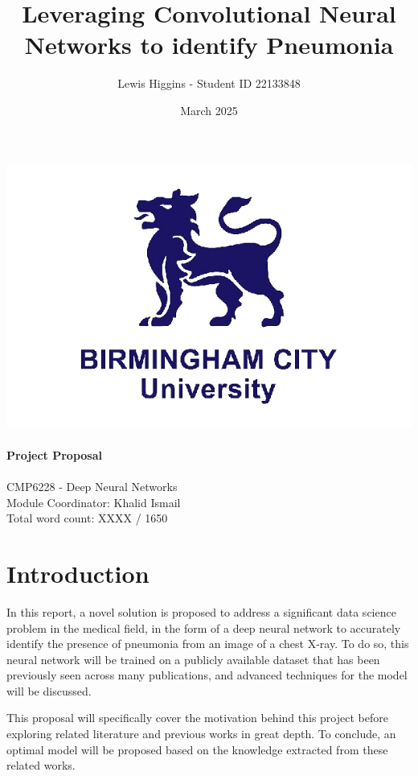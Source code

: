 \documentclass[12pt]{report}
\title{Leveraging Convolutional Neural Networks to identify Pneumonia}
\author{Lewis Higgins - Student ID 22133848}
\date{March 2025}
\newcommand{\para}{\vspace{7pt}\noindent}
\begin{document}
\makeatletter
\begin{titlepage}
    \begin{center}
        \includegraphics[width=0.7\linewidth]{BCU}\\[4ex]
        {\huge \bfseries \@title}\\[2ex]
        {\large \bfseries  Project Proposal}\\[50ex]
        {\@author}\\[2ex]
        {CMP6228 - Deep Neural Networks}\\[2ex]
        {Module Coordinator: Khalid Ismail}\\[2ex]
        {Total word count: XXXX / 1650}\\[10ex]
    \end{center}
\end{titlepage}
\makeatother
\thispagestyle{empty}
\newpage

\setcounter{page}{0}

\tableofcontents
\thispagestyle{empty}

\chapter*{Introduction}

In this report, a novel solution is proposed to address a significant data science problem in the medical field, in the form of 
a deep neural network to accurately identify the presence of pneumonia from an image of a chest X-ray. To do so, this neural network 
will be trained on a publicly available dataset that has been previously seen across many publications, and advanced techniques 
for the model will be discussed.

\para This proposal will specifically cover the motivation behind this project before exploring related literature and previous works 
in great depth. To conclude, an optimal model will be proposed based on the knowledge extracted from these related works. 
\end{document}

